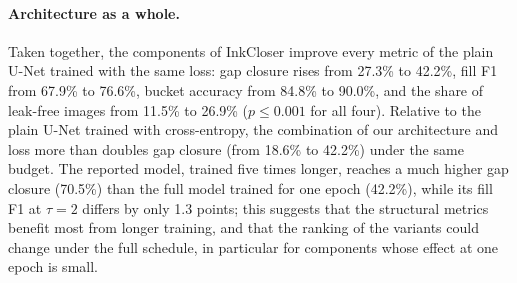 \documentclass[11pt]{article}
\begin{document}
\paragraph{Architecture as a whole.} Taken together, the components of InkCloser
improve every metric of the plain U-Net trained with the same loss: gap closure rises
from 27.3\% to 42.2\%, fill F1 from 67.9\% to 76.6\%, bucket accuracy from 84.8\% to
90.0\%, and the share of leak-free images from 11.5\% to 26.9\% ($p \le 0.001$ for all
four). Relative to the plain U-Net trained with cross-entropy, the combination of our
architecture and loss more than doubles gap closure (from 18.6\% to 42.2\%) under the
same budget. The reported model, trained five times longer, reaches a much higher gap
closure (70.5\%) than the full model trained for one epoch (42.2\%), while its fill F1
at $\tau=2$ differs by only 1.3 points; this suggests that the structural metrics
benefit most from longer training, and that the ranking of the variants could change
under the full schedule, in particular for components whose effect at one epoch is
small.

\begin{table}[t]
\centering
\caption{Bottleneck attention at the training length of the reported model.}
\label{tab:ablation_long}
\small
{}
\end{table}
\end{document}
